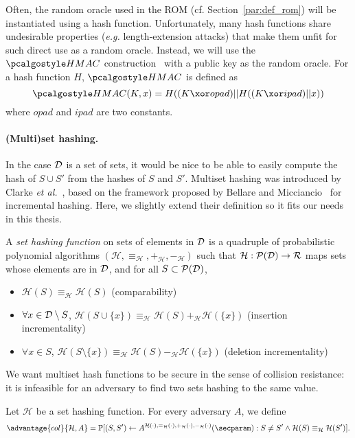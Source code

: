 Often, the random oracle used in the ROM (cf. Section~\ref{par:def_rom}) will be instantiated using a hash function.
Unfortunately, many hash functions share undesirable properties (\emph{e.g.} length-extension attacks) that make them unfit for such direct use as a random oracle.
Instead, we will use the $\HMAC$ construction~\cite{C:BelCanKra96} with a public key as the random oracle.
For a hash function $H$, $\HMAC$ is defined as
\[
	\HMAC{}(K,x) = H( (K \xor opad) || H( (K \xor ipad) || x))
\]
where $opad$ and $ipad$ are two constants.


\paragraph{(Multi)set hashing.} %
\label{par:def_set_hashing}

In the case $\mathcal{D}$ is a set of sets, it would be nice to be able to easily compute the hash of $S \cup S'$ from the hashes of $S$ and $S'$.
Multiset hashing was introduced by Clarke \emph{et al.}~\cite{AC:CDDGS03}, based on the framework proposed by Bellare and Micciancio~\cite{EC:BelMic97} for incremental hashing. 
Here, we slightly extend their definition so it fits our needs in this thesis.


A \emph{set hashing function} on sets of elements in $\mathcal{D}$ is a quadruple of probabilistic polynomial algorithms $(\mathcal{H},\equiv_\mathcal{H}, +_\mathcal{H}, -_\mathcal{H})$ such that 
$\mathcal{H} : \mathcal{P}(\mathcal{D}) \rightarrow \mathcal{R}$ maps sets whose elements are in $\mathcal{D}$, and for all $S \subset \mathcal{P}(\mathcal{D})$, 
\begin{itemize}
	\item $\mathcal{H}(S) \equiv_\mathcal{H} \mathcal{H}(S)$ (comparability) 
	\item $\forall x \in \mathcal{D} \setminus S$, $\mathcal{H}(S \cup \{x\} ) \equiv_\mathcal{H} \mathcal{H}(S) +_\mathcal{H} \mathcal{H}(\{x\})$ (insertion incrementality)
	\item $\forall x \in S$, $\mathcal{H}(S \setminus \{x\} ) \equiv_\mathcal{H} \mathcal{H}(S) -_\mathcal{H} \mathcal{H}(\{x\})$ (deletion incrementality)
\end{itemize}
We want multiset hash functions to be secure in the sense of collision resistance: it is infeasible for an adversary to find two sets hashing to the same value.

\begin{definition}
	Let $\mathcal{H}$ be a set hashing function.
	For every adversary $A$, we define
	\[
		\advantage{col}{\cH, A} = \Prob[(S,S') \gets A^{\mathcal{H}(\cdot),\equiv_\mathcal{H}(\cdot), +_\mathcal{H}(\cdot), -_\mathcal{H}(\cdot)}(\secparam) : S \neq S' \wedge \cH(S) \equiv_{\cH} \cH(S')].
	\]
\end{definition}

